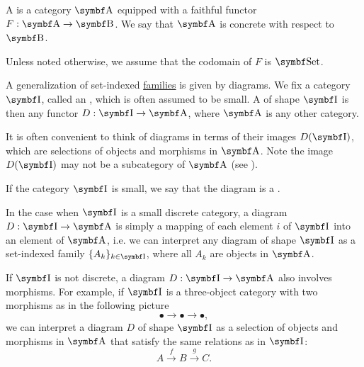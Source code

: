 \begin{definition}\label{def:concrete_category}
  A  is a category \( \Cat{A} \) equipped with a faithful functor \( F: \Cat{A} \to \Cat{B} \). We say that \( \Cat{A} \) is concrete with respect to \( \Cat{B} \).

  Unless noted otherwise, we assume that the codomain of \( F \) is \( \Cat{Set} \).
\end{definition}

\begin{definition}\label{def:categorical_diagram}
  A generalization of set-indexed \hyperref[def:indexed_family]{families} is given by diagrams. We fix a category \( \Cat{I} \), called an , which is often assumed to be small. A  of shape \( \Cat{I} \) is then any functor \( D: \Cat{I} \to \Cat{A} \), where \( \Cat{A} \) is any other category.

  It is often convenient to think of diagrams in terms of their images \( D(\Cat{I}) \), which are selections of objects and morphisms in \( \Cat{A} \). Note the image \( D(\Cat{I}) \) may not be a subcategory of \( \Cat{A} \) (see ).

  If the category \( \Cat{I} \) is small, we say that the diagram is a .
\end{definition}

\begin{example}\label{ex:categorical_diagrams}
  \mbox{}
  \begin{DefEnum}
    \item In the case when \( \Cat{I} \) is a small discrete category, a diagram \( D: \Cat{I} \to \Cat{A} \) is simply a mapping of each element \( i \) of \( \Cat{I} \) into an element of \( \Cat{A} \), i.e. we can interpret any diagram of shape \( \Cat{I} \) as a set-indexed family \( \{ A_k \}_{k \in \Cat{I}} \), where all \( A_k \) are objects in \( \Cat{A} \).

    \item If \( \Cat{I} \) is not discrete, a diagram \( D: \Cat{I} \to \Cat{A} \) also involves morphisms. For example, if \( \Cat{I} \) is a three-object category with two morphisms as in the following picture
    \begin{equation*}
      \bullet \longrightarrow \bullet \longrightarrow \bullet,
    \end{equation*}
    we can interpret a diagram \( D \) of shape \( \Cat{I} \) as a selection of objects and morphisms in \( \Cat{A} \) that satisfy the same relations as in \( \Cat{I} \):
    \begin{equation*}
      A
      \overset f \longrightarrow
      B
      \overset g \longrightarrow
      C.
    \end{equation*}
  \end{DefEnum}
\end{example}

